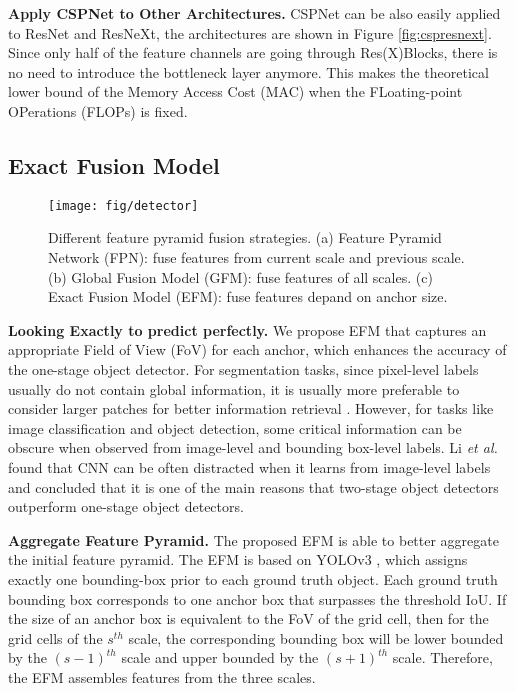 \documentclass{article}
\begin{document}
{\bf Apply CSPNet to Other Architectures.} CSPNet can be also easily applied to ResNet and ResNeXt, the architectures are shown in Figure \ref{fig:cspresnext}.  Since only half of the feature channels are going through Res(X)Blocks, there is no need to introduce the bottleneck layer anymore.  This makes the theoretical lower bound of the Memory Access Cost (MAC) when the FLoating-point OPerations (FLOPs) is fixed.

\subsection{Exact Fusion Model}

\begin{figure*}[t]
	\begin{center}
		\texttt{[image: fig/detector]}
	\end{center}
	\caption{Different feature pyramid fusion strategies.  (a) Feature Pyramid Network (FPN): fuse features from current scale and previous scale.  (b) Global Fusion Model (GFM): fuse features of all scales.  (c) Exact Fusion Model (EFM): fuse features depand on anchor size.   }
	\label{fig:detector}
\end{figure*}



{\bf Looking Exactly to predict perfectly.} We propose EFM that captures an appropriate Field of View (FoV) for each anchor, which enhances the accuracy of the one-stage object detector.  For segmentation tasks, since pixel-level labels usually do not contain global information, it is usually more preferable to consider larger patches for better information retrieval \cite{liu2015parsenet}. However, for tasks like image classification and object detection, some critical information can be obscure when observed from image-level and bounding box-level labels. Li \textit{et al.} \cite{li2018tell} found that CNN can be often distracted when it learns from image-level labels and concluded that it is one of the main reasons that two-stage object detectors outperform one-stage object detectors.

{\bf Aggregate Feature Pyramid.} The proposed EFM is able to better aggregate the initial feature pyramid. The EFM is based on YOLOv3 \cite{redmon2018yolov3}, which assigns exactly one bounding-box prior to each ground truth object. Each ground truth bounding box corresponds to one anchor box that surpasses the threshold IoU. If the size of an anchor box is equivalent to the FoV of the grid cell, then for the grid cells of the $s^{th}$ scale, the corresponding bounding box will be lower bounded by the $(s-1)^{th}$ scale and upper bounded by the $(s+1)^{th}$ scale. Therefore, the EFM assembles features from the three scales.
\end{document}
